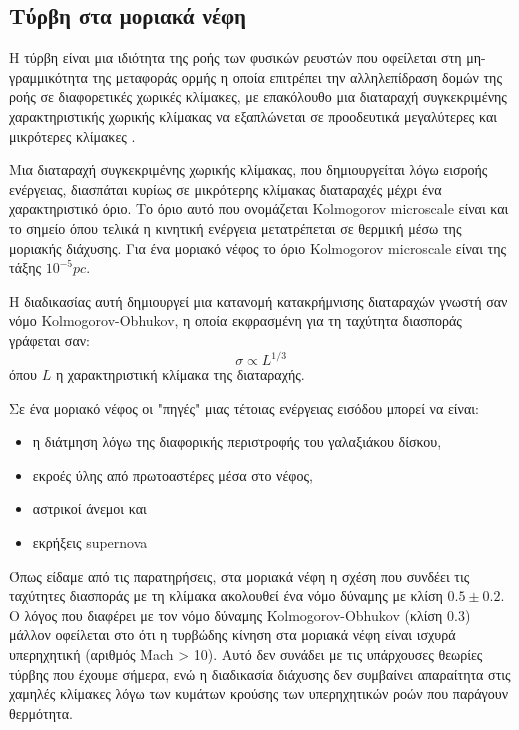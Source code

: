 \documentclass[a4paper,12pt]{memoir}
\begin{document}
\subsection{Τύρβη στα μοριακά νέφη}
Η τύρβη είναι μια ιδιότητα της ροής των φυσικών ρευστών που οφείλεται στη μη-γραμμικότητα της μεταφοράς ορμής η οποία επιτρέπει την αλληλεπίδραση δομών της ροής σε διαφορετικές χωρικές κλίμακες, με επακόλουθο μια διαταραχή συγκεκριμένης χαρακτηριστικής χωρικής κλίμακας να εξαπλώνεται σε προοδευτικά μεγαλύτερες και μικρότερες κλίμακες \cite{sofianos_turbulence}.

Μια διαταραχή συγκεκριμένης χωρικής κλίμακας, που δημιουργείται λόγω εισροής ενέργειας, διασπάται κυρίως σε μικρότερης κλίμακας διαταραχές μέχρι ένα χαρακτηριστικό όριο. Το όριο αυτό που ονομάζεται Kolmogorov microscale είναι και το σημείο όπου τελικά η κινητική ενέργεια μετατρέπεται σε θερμική μέσω της μοριακής διάχυσης. Για ένα μοριακό νέφος το όριο Kolmogorov microscale είναι της τάξης $10^{-5} pc$.

Η διαδικασίας αυτή δημιουργεί μια κατανομή κατακρήμνισης διαταραχών γνωστή σαν νόμο Kolmogorov-Obhukov, η οποία εκφρασμένη για τη ταχύτητα διασποράς γράφεται σαν:
\begin{equation}
\sigma \propto L^{1/3}
\end{equation} 
όπου $L$ η χαρακτηριστική κλίμακα της διαταραχής.

Σε ένα μοριακό νέφος οι "πηγές" μιας τέτοιας ενέργειας εισόδου μπορεί να είναι:
\begin{itemize}
	\item η διάτμηση λόγω της διαφορικής περιστροφής του γαλαξιάκου δίσκου,
	\item εκροές ύλης από πρωτοαστέρες μέσα στο νέφος,
	\item αστρικοί άνεμοι και
	\item εκρήξεις supernova
\end{itemize}

Όπως είδαμε από τις παρατηρήσεις, στα μοριακά νέφη η σχέση που συνδέει τις ταχύτητες διασποράς με τη κλίμακα ακολουθεί ένα νόμο δύναμης με κλίση $0.5 \pm 0.2$.  Ο λόγος που διαφέρει με τον νόμο δύναμης Kolmogorov-Obhukov (κλίση $0.3$) μάλλον οφείλεται στο ότι η τυρβώδης κίνηση στα μοριακά νέφη είναι ισχυρά υπερηχητική (αριθμός Mach > 10).
Αυτό δεν συνάδει με τις υπάρχουσες θεωρίες τύρβης που έχουμε σήμερα, ενώ η διαδικασία διάχυσης δεν συμβαίνει απαραίτητα στις χαμηλές κλίμακες λόγω των κυμάτων κρούσης των υπερηχητικών ροών που παράγουν θερμότητα.
\end{document}
